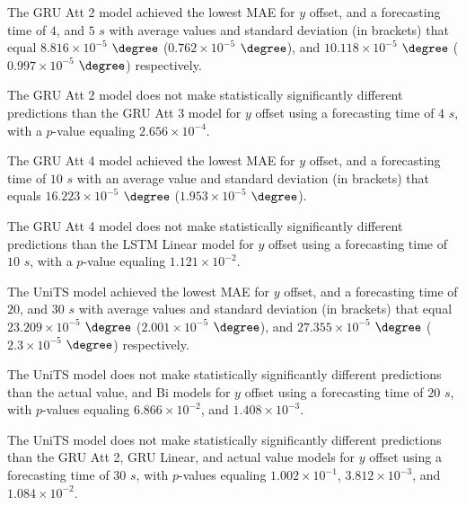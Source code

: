 
The GRU Att 2 model achieved the lowest MAE for $y$ offset, and a forecasting time of $4$, and $5$ $s$ with average values and standard deviation (in brackets) that equal $8.816 \times 10^{-5}$ $\degree$ ($0.762 \times 10^{-5}$ $\degree$), and $10.118 \times 10^{-5}$ $\degree$ ($0.997 \times 10^{-5}$ $\degree$) respectively.

The GRU Att 2 model does not make statistically significantly different predictions than the GRU Att 3 model for $y$ offset using a forecasting time of $4$ $s$, with a $p$-value equaling $2.656 \times 10^{-4}$.

The GRU Att 4 model achieved the lowest MAE for $y$ offset, and a forecasting time of $10$ $s$ with an average value and standard deviation (in brackets) that equals $16.223 \times 10^{-5}$ $\degree$ ($1.953 \times 10^{-5}$ $\degree$).

The GRU Att 4 model does not make statistically significantly different predictions than the LSTM Linear model for $y$ offset using a forecasting time of $10$ $s$, with a $p$-value equaling $1.121 \times 10^{-2}$.

The UniTS model achieved the lowest MAE for $y$ offset, and a forecasting time of $20$, and $30$ $s$ with average values and standard deviation (in brackets) that equal $23.209 \times 10^{-5}$ $\degree$ ($2.001 \times 10^{-5}$ $\degree$), and $27.355 \times 10^{-5}$ $\degree$ ($2.3 \times 10^{-5}$ $\degree$) respectively.

The UniTS model does not make statistically significantly different predictions than the actual value, and Bi models for $y$ offset using a forecasting time of $20$ $s$, with $p$-values equaling $6.866 \times 10^{-2}$, and $1.408 \times 10^{-3}$.

The UniTS model does not make statistically significantly different predictions than the GRU Att 2, GRU Linear, and actual value models for $y$ offset using a forecasting time of $30$ $s$, with $p$-values equaling $1.002 \times 10^{-1}$, $3.812 \times 10^{-3}$, and $1.084 \times 10^{-2}$.


